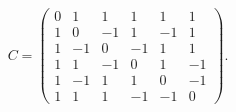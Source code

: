 \setcounter{equation}{51}
\begin{equation}
C=\begin{pmatrix}
0&1&1&1&1&1\\
1&0&-1&1&-1&1\\
1&-1&0&-1&1&1\\
1&1&-1&0&1&-1\\
1&-1&1&1&0&-1\\
1&1&1&-1&-1&0
\end{pmatrix}.
\end{equation}
